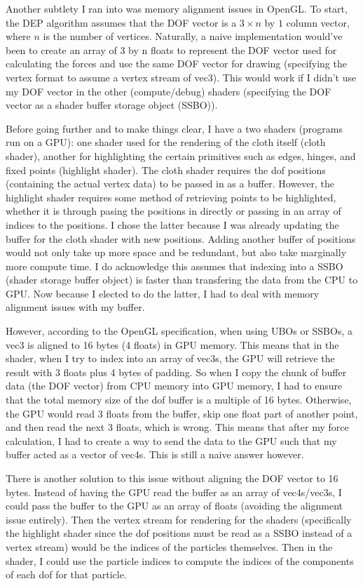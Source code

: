 \documentclass[letterpaper, 10 pt, conference]{ieeeconf}  %
\begin{document}
        Another subtlety I ran into was memory alignment issues in OpenGL. To start, the DEP algorithm assumes that the DOF vector is a $ 3 \times n $ by $ 1 $ column vector, where $n$ is the number of vertices. Naturally, a naive implementation would've been to create an array of 3 by n floats to represent the DOF vector used for calculating the forces and use the same DOF vector for drawing (specifying the vertex format to assume a vertex stream of vec3). This would work if I didn't use my DOF vector in the other (compute/debug) shaders (specifying the DOF vector as a shader buffer storage object (SSBO)).

        Before going further and to make things clear, I have a two shaders (programs run on a GPU): one shader used for the rendering of the cloth itself (cloth shader), another for highlighting the certain primitives such as edges, hinges, and fixed points (highlight shader). The cloth shader requires the dof positions (containing the actual vertex data) to be passed in as a buffer. However, the highlight shader requires some method of retrieving points to be highlighted, whether it is through pasing the positions in directly or passing in an array of indices to the positions. I chose the latter because I was already updating the buffer for the cloth shader with new positions. Adding another buffer of positions would not only take up more space and be redundant, but also take marginally more compute time. I do acknowledge this assumes that indexing into a SSBO (shader storage buffer object) is faster than transfering the data from the CPU to GPU. Now because I elected to do the latter, I had to deal with memory alignment issues with my buffer. 

        However, according to the OpenGL specification, when using UBOs or SSBOs, a vec3 is aligned to 16 bytes (4 floats) in GPU memory. This means that in the shader, when I try to index into an array of vec3s, the GPU will retrieve the result with 3 floats plus 4 bytes of padding. So when I copy the chunk of buffer data (the DOF vector) from CPU memory into GPU memory, I had to ensure that the total memory size of the dof buffer is a multiple of 16 bytes. Otherwise, the GPU would read 3 floats from the buffer, skip one float part of another point, and then read the next 3 floats, which is wrong. This means that after my force calculation, I had to create a way to send the data to the GPU such that my buffer acted as a vector of vec4s. This is still a naive answer however. 

        There is another solution to this issue without aligning the DOF vector to 16 bytes. Instead of having the GPU read the buffer as an array of vec4s/vec3s, I could pass the buffer to the GPU as an array of floats (avoiding the alignment issue entirely). Then the vertex stream for rendering for the shaders (specifically the highlight shader since the dof positions must be read as a SSBO instead of a vertex stream) would be the indices of the particles themselves. Then in the shader, I could use the particle indices to compute the indices of the components of each dof for that particle. 
\end{document}
